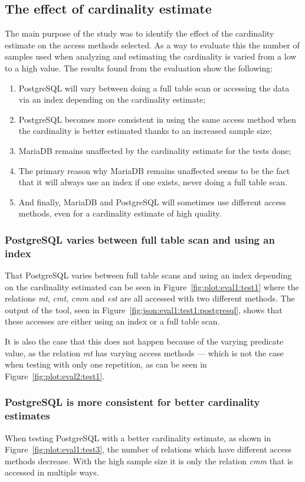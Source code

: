 \subsection{The effect of cardinality estimate}
The main purpose of the study was to identify the effect of the cardinality
estimate on the access methods selected. As a way to evaluate this the number of
samples used when analyzing and estimating the cardinality is varied from a low
to a high value. The results found from the evaluation show the following:
\begin{enumerate}
\item PostgreSQL will vary between doing a full table scan or accessing the data
  via an index depending on the cardinality estimate;
\item PostgreSQL becomes more consistent in using the same access method when
  the cardinality is better estimated thanks to an increased sample size;
\item MariaDB remains unaffected by the cardinality estimate for the tests done;
\item The primary reason why MariaDB remains unaffected seems to be the fact
  that it will always use an index if one exists, never doing a full table scan.
\item And finally, MariaDB and PostgreSQL will sometimes use different access
  methods, even for a cardinality estimate of high quality.
\end{enumerate}

\subsubsection{PostgreSQL varies between full table scan and using an index}
That PostgreSQL varies between full table scans and using an index depending on
the cardinality estimated can be seen in Figure~\ref{fig:plot:eval1:test1} where
the relations \textit{mt}, \textit{cmt}, \textit{cmm} and \textit{est} are all
accessed with two different methods. The output of the tool, seen in
Figure~\ref{fig:json:eval1:test1:postgresql}, shows that these accesses are
either using an index or a full table scan.

It is also the case that this does not happen because of the varying predicate
value, as the relation \textit{mt} has varying access methods --- which is not
the case when testing with only one repetition, as can be seen in
Figure~\ref{fig:plot:eval2:test1}.

\subsubsection{PostgreSQL is more consistent for better cardinality estimates}
When testing PostgreSQL with a better cardinality estimate, as shown in
Figure~\ref{fig:plot:eval1:test3}, the number of relations which have different
access methods decrease. With the high sample size it is only the relation
\textit{cmm} that is accessed in multiple ways.

